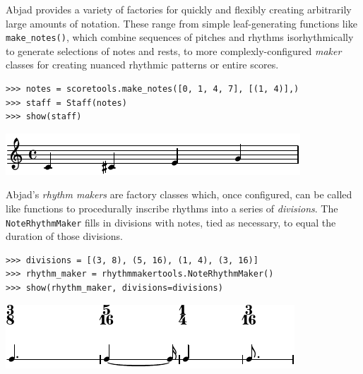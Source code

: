 \documentclass{article}
\begin{document}
\noindent Abjad provides a variety of factories for quickly and flexibly creating
arbitrarily large amounts of notation. These range from simple leaf-generating
functions like \texttt{make\_notes()}, which
combine sequences of pitches and rhythms isorhythmically to generate selections
of notes and rests, to more complexly-configured \emph{maker} classes for
creating nuanced rhythmic patterns or entire scores.

\begin{lstlisting}
>>> notes = scoretools.make_notes([0, 1, 4, 7], [(1, 4)],)
>>> staff = Staff(notes)
>>> show(staff)
\end{lstlisting}
\includegraphics{assets/lilypond-64155bcaa384109d40ae2616a2224dd1.pdf}

\noindent Abjad's \emph{rhythm makers} are factory classes which, once configured, can be
called like functions to procedurally inscribe rhythms into a series of
\emph{divisions}. The \texttt{NoteRhythmMaker} fills in divisions with notes,
tied as necessary, to equal the duration of those divisions.

\begin{lstlisting}
>>> divisions = [(3, 8), (5, 16), (1, 4), (3, 16)]
>>> rhythm_maker = rhythmmakertools.NoteRhythmMaker()
>>> show(rhythm_maker, divisions=divisions)
\end{lstlisting}
\includegraphics{assets/lilypond-af2aa88dc88360a6a0cf5c3f8da17b85.pdf}
\end{document}
